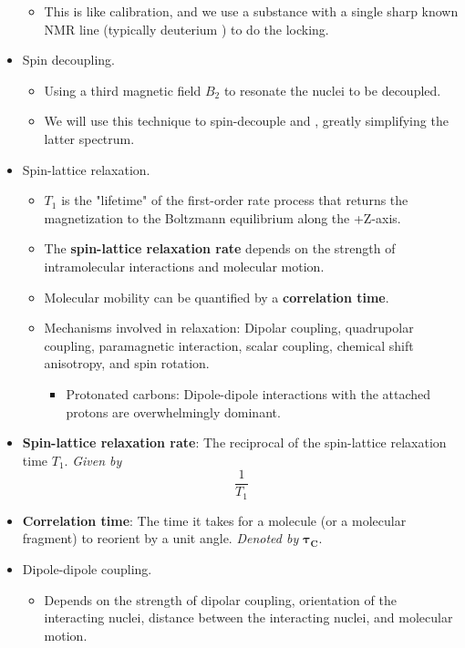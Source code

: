 \documentclass[../notes.tex]{subfiles}
\begin{document}
\begin{itemize}
\begin{itemize}
        \item This is like calibration, and we use a substance with a single sharp known NMR line (typically deuterium ) to do the locking.
    \end{itemize}
    \item Spin decoupling.
    \begin{itemize}
        \item Using a third magnetic field $B_2$ to resonate the nuclei to be decoupled.
        \item We will use this technique to spin-decouple  and , greatly simplifying the latter spectrum.
    \end{itemize}
    \item Spin-lattice relaxation.
    \begin{itemize}
        \item $T_1$ is the "lifetime" of the first-order rate process that returns the magnetization to the Boltzmann equilibrium along the +Z-axis.
        \item The \textbf{spin-lattice relaxation rate} depends on the strength of intramolecular interactions and molecular motion.
        \item Molecular mobility can be quantified by a \textbf{correlation time}.
        \item Mechanisms involved in relaxation: Dipolar coupling, quadrupolar coupling, paramagnetic interaction, scalar coupling, chemical shift anisotropy, and spin rotation.
        \begin{itemize}
            \item Protonated carbons: Dipole-dipole interactions with the attached protons are overwhelmingly dominant.
        \end{itemize}
    \end{itemize}
    \item \textbf{Spin-lattice relaxation rate}: The reciprocal of the spin-lattice relaxation time $T_1$. \emph{Given by}
    \begin{equation*}
        \frac{1}{T_1}
    \end{equation*}
    \item \textbf{Correlation time}: The time it takes for a molecule (or a molecular fragment) to reorient by a unit angle. \emph{Denoted by} $\bm{\tau_C}$.
    \item Dipole-dipole coupling.
    \begin{itemize}
        \item Depends on the strength of dipolar coupling, orientation of the interacting nuclei, distance between the interacting nuclei, and molecular motion.

\end{itemize}
\end{itemize}
\end{document}

